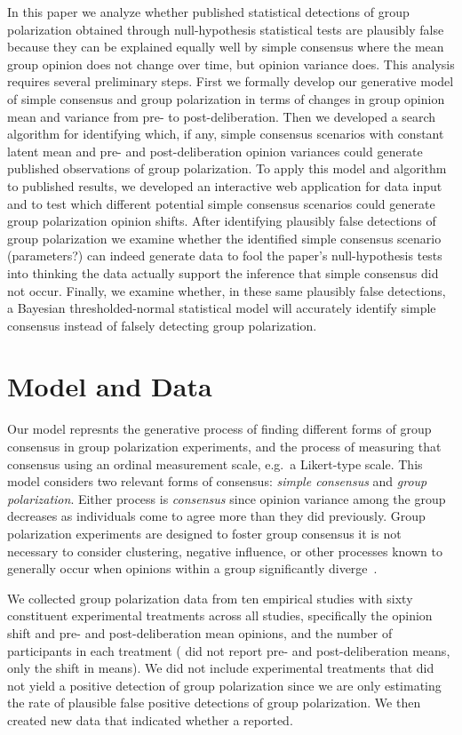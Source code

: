 \documentclass[12pt, letterpaper]{article}
\begin{document}
In this paper we analyze whether published statistical detections of group 
polarization obtained through null-hypothesis statistical tests
are plausibly false because they can be explained equally well by simple consensus
where the mean group opinion does not change over time, but opinion variance does.
This analysis requires several preliminary steps. 
First we formally develop our generative model of simple consensus and group 
polarization in terms of changes in group opinion mean and variance from 
pre- to post-deliberation. Then we developed a search algorithm for identifying 
which, if any, simple consensus scenarios with 
constant latent mean and pre- and post-deliberation opinion variances 
could generate published observations of group polarization. To apply this model
and algorithm to published results, we developed an interactive web application
for data input and to test which different potential simple consensus scenarios 
could generate group polarization opinion shifts. After identifying plausibly false
detections of group polarization we examine whether the identified simple
consensus scenario (parameters?) can indeed generate data to fool the 
paper's null-hypothesis tests into thinking the data actually support the inference
that simple consensus did not occur. Finally, we examine whether, in these same
plausibly false detections, a Bayesian thresholded-normal statistical model
will accurately identify simple consensus instead of falsely detecting group
polarization.

\section{Model and Data}

Our model represnts the generative process of finding different forms of group consensus
in group polarization experiments, and the process of measuring that consensus using
an ordinal measurement scale, e.g.\ a Likert-type scale. This model considers two
relevant forms of consensus: \emph{simple consensus} and \emph{group polarization}.
Either process is \emph{consensus} since opinion variance among the group 
decreases as individuals come to agree more than they did previously. 
Group polarization experiments are designed to foster group consensus
it is not necessary to consider clustering, negative influence, or other
processes known to generally occur when opinions within a group significantly
diverge~\cite{Turner2018}.

We collected group polarization data from ten empirical studies with sixty constituent
experimental treatments across all studies, specifically the opinion shift and pre- and
post-deliberation mean opinions, and the number of participants
in each treatment ( did not report pre- and post-deliberation
means, only the shift in means). We did not include experimental treatments that did not 
yield a positive detection of group polarization since we are only estimating
the rate of plausible false positive detections of group polarization. 
We then created new data that indicated whether a reported. 
\end{document}
